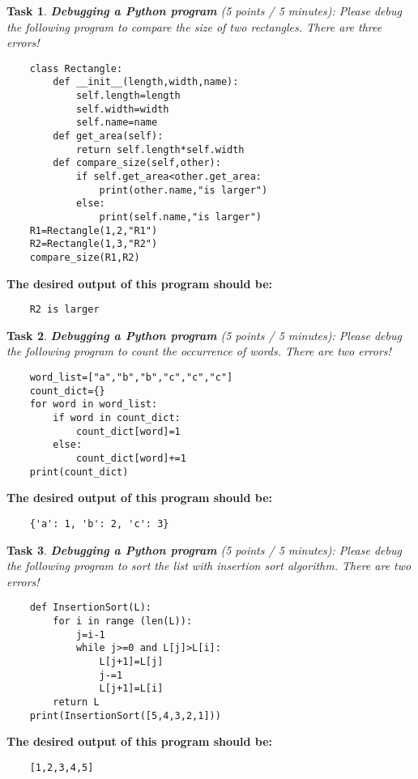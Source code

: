 \documentclass[UTF8]{ctexart}
\newtheorem{task}{Task}
\begin{document}
\newpage
\begin{task}
{\textbf{Debugging a Python program}} (5 points / 5 minutes): Please debug the following program to compare the size of two rectangles. There are three errors!
\end{task}
\begin{verbatim}
    class Rectangle:
        def __init__(length,width,name):
            self.length=length
            self.width=width
            self.name=name
        def get_area(self):
            return self.length*self.width
        def compare_size(self,other):
            if self.get_area<other.get_area:
                print(other.name,"is larger")
            else:
                print(self.name,"is larger")
    R1=Rectangle(1,2,"R1")
    R2=Rectangle(1,3,"R2")
    compare_size(R1,R2)
\end{verbatim}
\textbf{The desired output of this program should be:}
\begin{verbatim}
    R2 is larger
\end{verbatim}

\vspace{1cm}


\begin{task}
{\textbf{Debugging a Python program}} (5 points / 5 minutes): Please debug the following program to count the occurrence of words. There are two errors!
\end{task}
\begin{verbatim}
    word_list=["a","b","b","c","c","c"]
    count_dict={}
    for word in word_list:
        if word in count_dict:
            count_dict[word]=1
        else:
            count_dict[word]+=1
    print(count_dict)
\end{verbatim}
\textbf{The desired output of this program should be:}
\begin{verbatim}
    {'a': 1, 'b': 2, 'c': 3}
\end{verbatim}

\newpage
\begin{task}
{\textbf{Debugging a Python program}} (5 points / 5 minutes): Please debug the following program to sort the list with insertion sort algorithm. There are two errors!
\end{task}
\begin{verbatim}
    def InsertionSort(L):
        for i in range (len(L)):
            j=i-1
            while j>=0 and L[j]>L[i]:
                L[j+1]=L[j]
                j-=1
                L[j+1]=L[i]
        return L
    print(InsertionSort([5,4,3,2,1]))  
\end{verbatim}
\textbf{The desired output of this program should be:}
\begin{verbatim}
    [1,2,3,4,5]
\end{verbatim}
\end{document}
